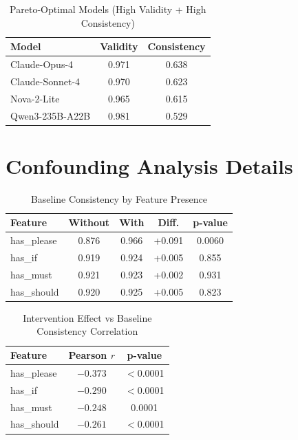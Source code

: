 \documentclass[sigconf,anonymous,review]{acmart}
\begin{document}
\begin{table}[h]
\centering
\caption{Pareto-Optimal Models (High Validity + High Consistency)}
\small
\begin{tabular}{@{}lcc@{}}
\toprule
\textbf{Model} & \textbf{Validity} & \textbf{Consistency} \\
\midrule
Claude-Opus-4 & 0.971 & 0.638 \\
Claude-Sonnet-4 & 0.970 & 0.623 \\
Nova-2-Lite & 0.965 & 0.615 \\
Qwen3-235B-A22B & 0.981 & 0.529 \\
\bottomrule
\end{tabular}
\end{table}

\section{Confounding Analysis Details}
\label{app:confounding}

\begin{table}[h]
\centering
\caption{Baseline Consistency by Feature Presence}
\small
\begin{tabular}{@{}lcccc@{}}
\toprule
\textbf{Feature} & \textbf{Without} & \textbf{With} & \textbf{Diff.} & \textbf{p-value} \\
\midrule
has\_please & 0.876 & 0.966 & +0.091 & 0.0060 \\
has\_if & 0.919 & 0.924 & +0.005 & 0.855 \\
has\_must & 0.921 & 0.923 & +0.002 & 0.931 \\
has\_should & 0.920 & 0.925 & +0.005 & 0.823 \\
\bottomrule
\end{tabular}
\end{table}

\begin{table}[h]
\centering
\caption{Intervention Effect vs Baseline Consistency Correlation}
\small
\begin{tabular}{@{}lcc@{}}
\toprule
\textbf{Feature} & \textbf{Pearson $r$} & \textbf{p-value} \\
\midrule
has\_please & $-0.373$ & $<$0.0001 \\
has\_if & $-0.290$ & $<$0.0001 \\
has\_must & $-0.248$ & 0.0001 \\
has\_should & $-0.261$ & $<$0.0001 \\
\bottomrule
\end{tabular}
\end{table}
\end{document}
